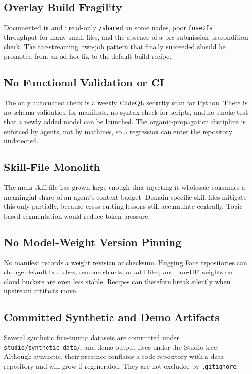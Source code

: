 \documentclass[11pt]{article}
\newcommand{\code}[1]{\texttt{#1}}
\newcommand{\file}[1]{\texttt{\small #1}}
\begin{document}
\subsection{Overlay Build Fragility}
Documented in  and : read-only \code{/shared} on
some nodes, poor \code{fuse2fs} throughput for many small files, and the absence of a
pre-submission precondition check. The tar-streaming, two-job pattern that finally
succeeded should be promoted from an ad hoc fix to the default build recipe.

\subsection{No Functional Validation or CI}
The only automated check is a weekly CodeQL security scan for Python. There is no
schema validation for manifests, no syntax check for scripts, and no smoke test that a
newly added model can be launched. The organic-propagation discipline is enforced by
agents, not by machines, so a regression can enter the repository undetected.

\subsection{Skill-File Monolith}
The main skill file has grown large enough that injecting it wholesale consumes a
meaningful share of an agent's context budget. Domain-specific skill files mitigate
this only partially, because cross-cutting lessons still accumulate centrally.
Topic-based segmentation would reduce token pressure.

\subsection{No Model-Weight Version Pinning}
No manifest records a weight revision or checksum. Hugging Face repositories can change
default branches, rename shards, or add files, and non-HF weights on cloud buckets are
even less stable. Recipes can therefore break silently when upstream artifacts move.

\subsection{Committed Synthetic and Demo Artifacts}
Several synthetic fine-tuning datasets are committed under \file{studio/synthetic\_data/},
and demo output lives under the Studio tree. Although synthetic, their presence conflates
a code repository with a data repository and will grow if regenerated. They are not
excluded by \file{.gitignore}.
\end{document}
